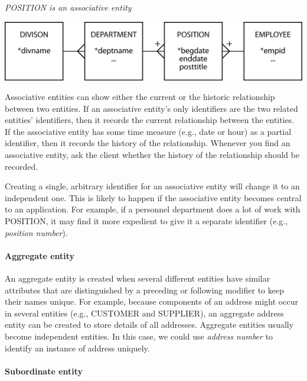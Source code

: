 \documentclass[
]{article}
\begin{document}
\emph{POSITION is an associative entity}

\includegraphics{Figures/Chapter 7/history-2.png}

Associative entities can show either the current or the historic
relationship between two entities. If an associative entity's only
identifiers are the two related entities' identifiers, then it records
the current relationship between the entities. If the associative entity
has some time measure (e.g., date or hour) as a partial identifier, then
it records the history of the relationship. Whenever you find an
associative entity, ask the client whether the history of the
relationship should be recorded.

Creating a single, arbitrary identifier for an associative entity will
change it to an independent one. This is likely to happen if the
associative entity becomes central to an application. For example, if a
personnel department does a lot of work with POSITION, it may find it
more expedient to give it a separate identifier (e.g., \emph{position
number}).

\hypertarget{aggregate-entity}{%
\paragraph*{Aggregate entity}\label{aggregate-entity}}

An aggregate entity is created when several different entities have
similar attributes that are distinguished by a preceding or following
modifier to keep their names unique. For example, because components of
an address might occur in several entities (e.g., CUSTOMER and
SUPPLIER), an aggregate address entity can be created to store details
of all addresses. Aggregate entities usually become independent
entities. In this case, we could use \emph{address number} to identify an
instance of address uniquely.

\hypertarget{subordinate-entity}{%
\paragraph*{Subordinate entity}\label{subordinate-entity}}
\end{document}

